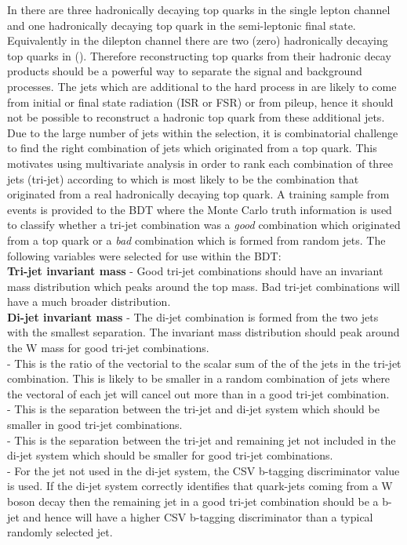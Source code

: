 In \tttt there are three hadronically decaying top quarks in the single lepton channel and one hadronically decaying top quark in the semi-leptonic \ttbar final state. Equivalently in the dilepton channel there are two (zero) hadronically decaying top quarks in \tttt (\ttbar). Therefore reconstructing top quarks from their hadronic decay products should be a powerful way to separate the signal and background processes. The jets which are additional to the hard process in \ttbar are likely to come from initial or final state radiation (ISR or FSR) or from pileup, hence it should not be possible to reconstruct a hadronic top quark from these additional jets. Due to the large number of jets within the selection, it is combinatorial challenge to find the right combination of jets which originated from a top quark. This motivates using multivariate analysis in order to rank each combination of three jets (tri-jet) according to which is most likely to be the combination that originated from a real hadronically decaying top quark.
A training sample from \ttbar events is provided to the BDT where the Monte Carlo truth information is used to classify whether a tri-jet combination was a \emph{good} combination which originated from a top quark or a \emph{bad} combination which is formed from random jets. The following variables were selected for use within the BDT:\\
\textbf{Tri-jet invariant mass} - Good tri-jet combinations should have an invariant mass distribution which peaks around the top mass.
Bad tri-jet combinations will have a much broader distribution. \\
\textbf{Di-jet invariant mass} - The di-jet combination is formed from the two jets with the smallest \DR separation. The invariant mass distribution should peak around the W mass for good tri-jet combinations.\\
\textbf{\ptrat} - This is the ratio of the vectorial \pt to the scalar sum of the \pt of the jets in the tri-jet combination. This is likely to be smaller in a random combination of jets where the vectoral \pt of each jet will cancel out more than in a good tri-jet combination.\\
\textbf{\DPTW} - This is the \Dphi separation between the tri-jet and di-jet system which should be smaller in good tri-jet combinations.\\
\textbf{\DPTb} - This is the \Dphi separation between the tri-jet and remaining jet not included in the di-jet system which should be smaller for good tri-jet combinations.\\
\textbf{\CSVj} - For the jet not used in the di-jet system, the CSV b-tagging discriminator value is used. If the di-jet system correctly identifies that quark-jets coming from a W boson decay then the remaining jet in a good tri-jet combination should be a b-jet and hence will have a higher CSV b-tagging discriminator than a typical randomly selected jet.\\

